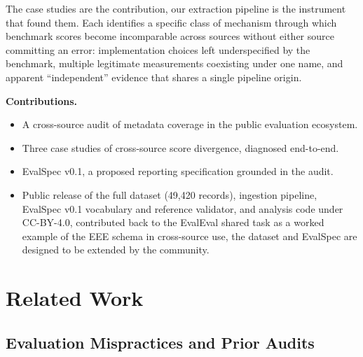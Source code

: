 \documentclass[11pt]{article}
\begin{document}
The case studies are the contribution, our extraction pipeline is the
instrument that found them. Each identifies a specific class of mechanism
through which benchmark scores become incomparable across sources without
either source committing an error: implementation choices left
underspecified by the benchmark, multiple legitimate measurements coexisting
under one name, and apparent ``independent'' evidence that shares a single
pipeline origin.

\textbf{Contributions.}
\begin{itemize}
    \item A cross-source audit of metadata coverage in the public evaluation ecosystem.
    \item Three case studies of cross-source score divergence, diagnosed end-to-end.
    \item EvalSpec v0.1, a proposed reporting specification grounded in the audit.
    \item Public release of the full dataset (49{,}420 records), ingestion
      pipeline, EvalSpec v0.1 vocabulary and reference validator, and analysis
      code under CC-BY-4.0, contributed back to the EvalEval shared task
      \citep{evaleval2026everyevalever} as a worked example of the EEE schema in
      cross-source use, the dataset and EvalSpec are designed to be extended
      by the community.
\end{itemize}

\section{Related Work}
\label{sec:related}
\subsection{Evaluation Mispractices and Prior Audits}
\end{document}
